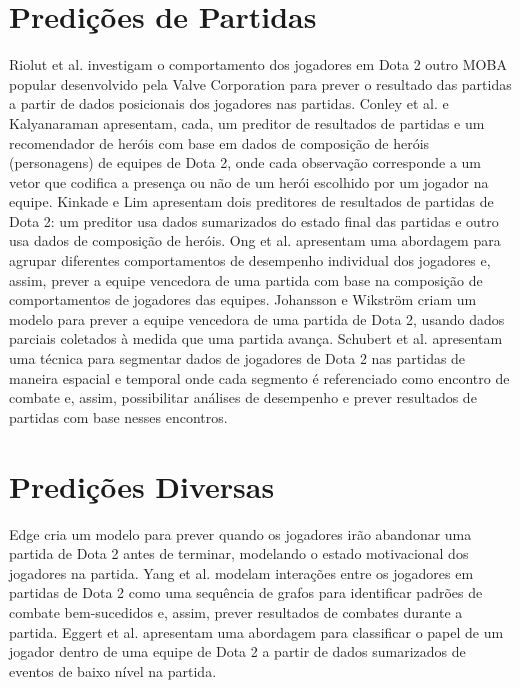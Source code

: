 \section{Predições de Partidas}
Riolut et al. \cite{rioult2014mining} investigam  o comportamento dos jogadores em Dota 2\fj{,}{ - } outro MOBA popular desenvolvido pela Valve Corporation para prever o resultado das partidas a partir de dados posicionais dos jogadores nas partidas. Conley et al. \cite{conley2013does} e Kalyanaraman \cite{kalyanaraman2014win} apresentam, cada, um preditor de resultados de partidas e um recomendador de heróis com base em dados de composição de heróis (personagens) de equipes de Dota 2, onde cada observação corresponde a um vetor que codifica a presença ou não de um herói escolhido por um jogador na equipe. Kinkade e Lim \cite{kinkade2015dota} apresentam dois preditores de resultados de partidas de Dota 2: um preditor usa dados sumarizados do estado final das partidas e outro usa dados de composição de heróis. Ong et al. \cite{ong2015player} apresentam uma abordagem para agrupar diferentes comportamentos de desempenho individual dos jogadores e, assim, prever a equipe vencedora de uma partida com base na composição de comportamentos de jogadores das equipes. Johansson e Wikstr\"om \cite {johansson2015result} criam um modelo para prever a equipe vencedora de uma partida de Dota 2, usando dados parciais coletados à medida que uma partida avança. Schubert et al. \cite{schubert2016esports} apresentam uma técnica para segmentar dados de jogadores de Dota 2 nas partidas de maneira espacial e temporal onde cada segmento é referenciado como encontro de combate e, assim, possibilitar análises de desempenho e prever resultados de partidas com base nesses encontros.

\section{Predições Diversas}
Edge \cite{edge2013predicting} cria um modelo para prever quando os jogadores irão abandonar uma partida de Dota 2 antes de terminar, modelando o estado motivacional dos jogadores na partida. Yang et al. \cite{yang2014identifying} modelam interações entre os jogadores em partidas de Dota 2 como uma sequência de grafos para identificar padrões de combate bem-sucedidos e, assim, prever resultados de combates durante a partida. Eggert et al. \cite{eggert2015classification} apresentam uma abordagem para classificar o papel de um jogador dentro de uma equipe de Dota 2 a partir de dados sumarizados de eventos de baixo nível na partida.

